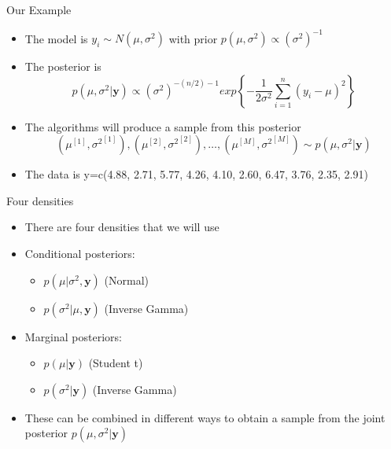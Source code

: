 \documentclass[10pt]{beamer}
\begin{document}
\begin{frame}{Our Example}
  \begin{itemize}
  \item The model is $y_i\sim N(\mu,\sigma^2)$ with prior $p(\mu,\sigma^2)\propto (\sigma^2)^{-1}$

  \item The posterior is
    \begin{equation}
      p(\mu,\sigma^2|{\bm y})\propto
      (\sigma^2)^{-(n/2)-1}
      exp\left\{-\frac{1}{2\sigma^2}\sum\limits_{i=1}^{n}\left(y_i-\mu\right)^2\right\}
    \end{equation}

  \item The algorithms will produce a sample from this posterior
    \begin{equation*}
      \left(\mu^{[1]},{\sigma^2}^{[1]}\right),
      \left(\mu^{[2]},{\sigma^2}^{[2]}\right),
      \ldots,
      \left(\mu^{[M]},{\sigma^2}^{[M]}\right)\sim p(\mu,\sigma^2|{\bm y})
    \end{equation*}

  \item The data is y=c(4.88, 2.71, 5.77, 4.26, 4.10, 2.60, 6.47, 3.76, 2.35, 2.91)
  \end{itemize}
\end{frame}
\begin{frame}{Four densities}
  \begin{itemize}
  \item There are four densities that we will use

  \item Conditional posteriors:

    \begin{itemize}
    \item $p(\mu|\sigma^2,{\bm y})$ (Normal)
    \item $p(\sigma^2|\mu,{\bm y})$ (Inverse Gamma)
    \end{itemize}

  \item Marginal posteriors:

    \begin{itemize}
    \item $p(\mu|{\bm y})$ (Student t)
    \item $p(\sigma^2|{\bm y})$ (Inverse Gamma)
    \end{itemize}

  \item These can be combined in different ways to obtain a sample from the joint posterior $p(\mu,\sigma^2|{\bm y})$
  \end{itemize}
\end{frame}
\end{document}

